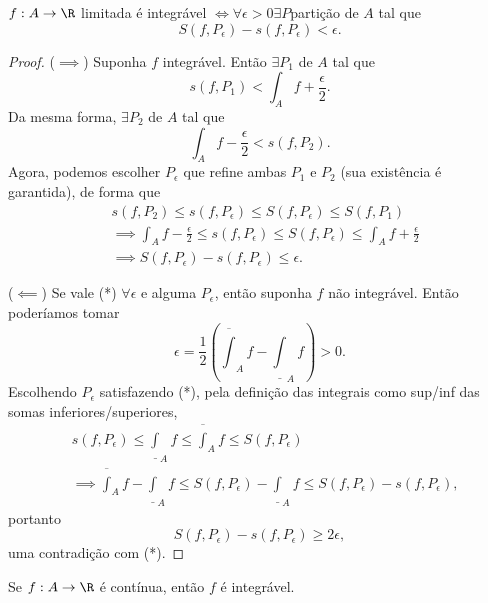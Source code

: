 \begin{prop}
    $f:A\to \R$ limitada é integrável $\iff \forall \epsilon>0 \exists P $partição de $A$ tal que  \[
    S\left( f, P_\epsilon \right) - s\left( f,P_\epsilon \right) <\epsilon \tag{*}
    .\] 
\end{prop}
\begin{proof}
    ($\implies$) Suponha $f$ integrável. Então $\exists P_1$ de $A$ tal que \[
    s\left( f, P_1 \right) < \int_A f + \frac{\epsilon}{2}
    .\] Da mesma forma, $\exists P_2$ de $A$ tal que \[
    \int_A f - \frac{\epsilon}{2} < s\left( f, P_2 \right) 
    .\] Agora, podemos escolher $P_\epsilon$ que refine ambas $P_1$ e $P_2$ (sua existência é garantida), de forma que
    \begin{align*}
	& s\left( f, P_2 \right) \le s\left( f,P_\epsilon \right) \le S\left( f,P_\epsilon \right) \le S\left( f,P_1 \right) \\
	& \implies \int_A f - \frac{\epsilon}{2} \le s\left( f,P_\epsilon \right) \le S\left( f,P_\epsilon \right) \le \int_A f + \frac{\epsilon}{2} \\
	& \implies S\left( f, P_\epsilon \right) - s\left( f, P_\epsilon \right) \le \epsilon
    .\end{align*}

    ($\impliedby$) Se vale (*) $\forall \epsilon$ e alguma $P_\epsilon$, então suponha  $f$ não integrável. Então poderíamos tomar \[
	\epsilon = \frac{1}{2}\left( \overline{\int}_A f - \underline{\int}_A f \right) > 0
    .\] Escolhendo $P_\epsilon$ satisfazendo (*), pela definição das integrais como sup/inf das somas inferiores/superiores,
    \begin{align*}
	& s\left( f, P_\epsilon \right) \le \underline{\int}_A f \le \overline{\int}_A f\le S\left( f, P_\epsilon \right) \\
	&\implies \overline{\int}_A f - \underline{\int}_A f \le S\left( f, P_\epsilon \right) - \underline{\int}_A f \le S\left( f, P_\epsilon \right) -s\left( f, P_\epsilon \right)
    ,\end{align*}
     portanto \[
	S\left( f, P_\epsilon \right) - s\left( f, P_\epsilon \right) \ge 2\epsilon
    ,\] uma contradição com (*).
\end{proof}
\begin{corollary}
    Se $f:A\to \R$ é contínua, então $f$ é integrável.
\end{corollary}
